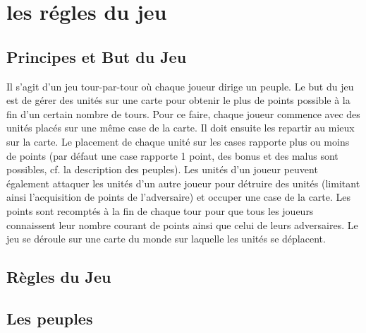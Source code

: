 
	\section{les régles du jeu}

	\subsection{Principes et But du Jeu}
	Il s’agit d’un jeu tour-par-tour où chaque joueur dirige un peuple. Le but du jeu est de gérer des
	unités sur une carte pour obtenir le plus de points possible à la fin d’un certain nombre de tours.
	Pour ce faire, chaque joueur commence avec des unités placés sur une même case de la carte. Il doit
	ensuite les repartir au mieux sur la carte. Le placement de chaque unité sur les cases rapporte plus
	ou moins de points (par défaut une case rapporte 1 point, des bonus et des malus sont possibles, cf.
	la description des peuples). Les unités d’un joueur peuvent également attaquer les unités d’un autre
	joueur pour détruire des unités (limitant ainsi l’acquisition de points de l’adversaire) et occuper
	une case de la carte. Les points sont recomptés à la fin de chaque tour pour que tous les joueurs
	connaissent leur nombre courant de points ainsi que celui de leurs adversaires. Le jeu se déroule sur
	une carte du monde sur laquelle les unités se déplacent.


	\subsection{Règles du Jeu }


	\subsection{Les peuples }

